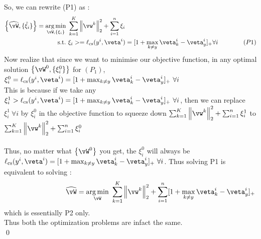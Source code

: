 \documentclass[a4paper,11pt]{article}
\begin{document}
\begin{mlsolution}
So, we can rewrite (P1) as :
\begin{align*}
\bc{\widehat\vW, \{\hat\xi_i\}} = \underset{\vW,\bc{\xi_i}}{\arg\min}&\ \sum_{k=1}^K\norm{\vw^k}_2^2 + \sum_{i=1}^n\xi_i\\
\text{s.t.} &\ \xi_i >= \ell_\text{cs}(y^i,\veta^i) = [1 + \max_{k \neq y}\veta^i_k - \veta^i_y]_+ \forall i \qquad\qquad{(P1)}\\
\end{align*}
Now realize that since we want to minimise our objective function, in any optimal solution $\bc{\vW^0, \{\xi^0_i\}}$ for $(P_1)$,  $\xi^0_i = \ell_\text{cs}(y^i,\veta^i) = [1 + \max_{k \neq y}\veta^i_k - \veta^i_y]_+ \ \forall i$ \\


This is because if we take any $\xi^1_i > \ell_\text{cs}(y^i,\veta^i) = [1 + \max_{k \neq y}\veta^i_k - \veta^i_y]_+ \ \forall i$, then we can replace  $\xi^1_i \ \forall i$ by $\xi^0_i$ in the objective function to squeeze down $\sum_{k=1}^K\norm{\vw^k}_2^2 + \sum_{i=1}^n\xi^1_i$ to $\sum_{k=1}^K\norm{\vw^k}_2^2 + \sum_{i=1}^n\xi^0_i$ \\ \\
Thus, no matter what $\bc{\vW^0}$ you get, the $\xi^0_i$ will always be $\ell_\text{cs}(y^i,\veta^i) = [1 + \max_{k \neq y}\veta^i_k - \veta^i_y]_+ \ \forall i$. Thus solving P1 is equivalent to solving :
\[
	\phantom{\hspace{20ex}}\widehat\vW = \underset{\vW}{\arg\min}\ \sum_{k=1}^K\norm{\vw^k}_2^2 + \sum_{i=1}^n[1 + \max_{k \neq y}\veta^i_k - \veta^i_y]_+
	\]
which is essentially P2 only.\\
Thus both the optimization problems are infact the same.\\
\qed

\end{mlsolution}
\end{document}
